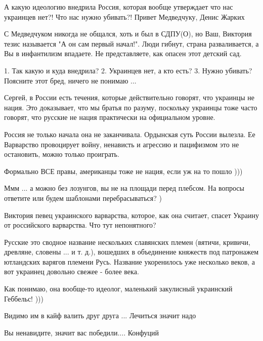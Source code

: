 \begin{itemize}

А какую идеологию внедрила Россия, которая вообще утверждает что нас украинцев
нет?! Что нас нужно убивать?! Привет Медведчуку, Денис Жарких


С Медведчуком никогда не общался, хоть и был в СДПУ(О), но Ваш, Виктория тезис
называется "А он сам первый начал!". Люди гибнут, страна разваливается, а Вы в
инфантилизм впадаете. Не представляете, как опасен этот детский сад.


1. Так какую и куда внедрила? 2. Украинцев нет, а кто есть? 3. Нужно убивать? Поясните этот бред, ничего не понимаю ...


Сергей, в России есть течения, которые действительно говорят, что украинцы не
нация. Это доказывает, что мы братья по разуму, поскольку украинцы тоже часто
говорят, что русские не нация практически на официальном уровне.


Россия не только начала она не заканчивала. Ордынская суть России вылезла. Ее
Варварство провоцирует войну, ненависть и агрессию и пацифизмом это не
остановить, можно только проиграть.

Формально ВСЕ правы, американцы тоже не нация, если уж на то пошло )))

Ммм ... а можно без лозунгов, вы не на площади перед плебсом. На вопросы ответите или будем шаблонами перебрасываться? )

Виктория певец украинского варварства, которое, как она считает, спасет Украину от российского варварства. Что тут непонятного?


Русские это сводное название нескольких славянских племен (вятичи, кривичи,
древляне, словены ... и т. д.), вошедших в объединение княжеств под патронажем
ютландских варягов племени Русь. Название укоренилось уже несколько веков, а
вот украинец довольно свежее - более века.

Как понимаю, она вообще-то идеолог, маленький закулисный украинский Геббельс! )))

Видимо им в кайф валить друг друга ... Лечиться значит надо

Вы ненавидите, значит вас победили.... Конфуций


\end{itemize}
